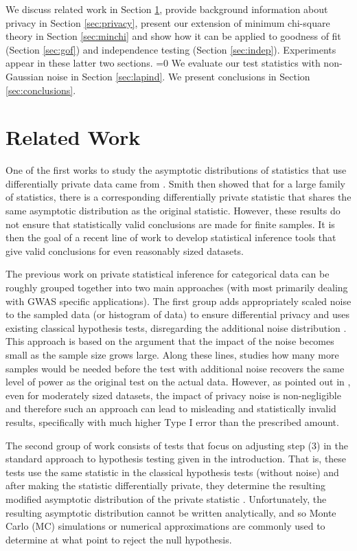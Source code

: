 \documentclass[twoside,letterpaper]{article} \usepackage{aistats2017}
\theoremstyle{definition}
\theoremstyle{remark}
\begin{document}
We discuss related work in Section \ref{sec:related}, provide background information about privacy in Section \ref{sec:privacy}, present our extension of minimum chi-square theory in Section \ref{sec:minchi} and show how it can be applied to goodness of fit (Section \ref{sec:gof}) and independence testing (Section \ref{sec:indep}). Experiments appear in these latter two sections.
=0
We evaluate our test statistics with non-Gaussian noise in Section \ref{sec:lapind}.
\fi
We present conclusions in Section \ref{sec:conclusions}.

\section{Related Work}\label{sec:related}

One of the first works to study the asymptotic distributions of statistics that use differentially private data came from \citet{WZ10}.  Smith \cite{Smith11} then showed that for a large family of statistics, there is a corresponding differentially private statistic that shares the same asymptotic distribution as the original statistic.  However, these results do not ensure that statistically valid conclusions are made for finite samples. It is then the goal of a recent line of work to develop statistical inference tools that give valid conclusions for even reasonably sized datasets.  

The previous work on private statistical inference for categorical data can be roughly grouped together into two main approaches (with most primarily dealing with GWAS specific applications).  The first group adds appropriately scaled noise to the sampled data (or histogram of data) to ensure differential privacy and uses existing classical hypothesis tests, disregarding the additional noise distribution \cite{JS13}.  This approach is based on the argument that the impact of the noise becomes small as the sample size grows large.  Along these lines, \cite{VS09} studies how many more samples would be needed before the test with additional noise recovers the same level of power as the original test on the actual data.  However, as pointed out in \cite{FRY10,KS12,KS16,GLRV16}, even for moderately sized datasets, the impact of privacy noise is non-negligible and therefore such an approach can lead to misleading and statistically invalid results, specifically with much higher Type I error than the prescribed amount.  

The second group of work consists of tests that focus on adjusting step (3) in the standard approach to hypothesis testing given in the introduction.  That is, these tests use the same statistic in the classical hypothesis tests (without noise) and after making the statistic differentially private, they determine the resulting modified asymptotic distribution of the private statistic \cite{USF13,YFSU14,WLK15,GLRV16}.  Unfortunately, the resulting asymptotic distribution cannot be written analytically, and so Monte Carlo (MC) simulations or numerical approximations are commonly used to determine at what point to reject the null hypothesis.  
\end{document}
